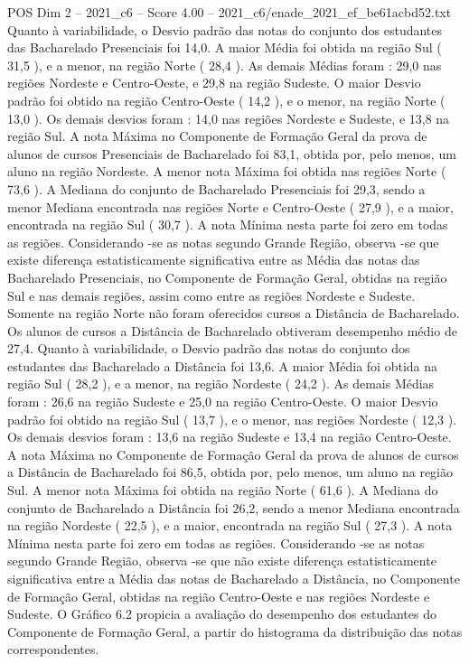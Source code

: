 \begin{textsample}{POS Dim 2 – 2021\_c6 – Score 4.00 – 2021\_c6/enade\_2021\_ef\_be61acbd52.txt}
Quanto à variabilidade, o Desvio padrão das notas do conjunto dos estudantes das Bacharelado Presenciais foi 14,0.
A maior Média foi obtida na região Sul ( 31,5 ), e a menor, na região Norte ( 28,4 ).
As demais Médias foram : 29,0 nas regiões Nordeste e Centro-Oeste, e 29,8 na região Sudeste.
O maior Desvio padrão foi obtido na região Centro-Oeste ( 14,2 ), e o menor, na região Norte ( 13,0 ).
Os demais desvios foram : 14,0 nas regiões Nordeste e Sudeste, e 13,8 na região Sul.
A nota Máxima no Componente de Formação Geral da prova de alunos de cursos Presenciais de Bacharelado foi 83,1, obtida por, pelo menos, um aluno na região Nordeste.
A menor nota Máxima foi obtida nas regiões Norte ( 73,6 ).
A Mediana do conjunto de Bacharelado Presenciais foi 29,3, sendo a menor Mediana encontrada nas regiões Norte e Centro-Oeste ( 27,9 ), e a maior, encontrada na região Sul ( 30,7 ).
A nota Mínima nesta parte foi zero em todas as regiões.
Considerando -se as notas segundo Grande Região, observa -se que existe diferença estatisticamente significativa entre as Média das notas das Bacharelado Presenciais, no Componente de Formação Geral, obtidas na região Sul e nas demais regiões, assim como entre as regiões Nordeste e Sudeste.
Somente na região Norte não foram oferecidos cursos a Distância de Bacharelado.
Os alunos de cursos a Distância de Bacharelado obtiveram desempenho médio de 27,4.
Quanto à variabilidade, o Desvio padrão das notas do conjunto dos estudantes das Bacharelado a Distância foi 13,6.
A maior Média foi obtida na região Sul ( 28,2 ), e a menor, na região Nordeste ( 24,2 ).
As demais Médias foram : 26,6 na região Sudeste e 25,0 na região Centro-Oeste.
O maior Desvio padrão foi obtido na região Sul ( 13,7 ), e o menor, nas regiões Nordeste ( 12,3 ).
Os demais desvios foram : 13,6 na região Sudeste e 13,4 na região Centro-Oeste.
A nota Máxima no Componente de Formação Geral da prova de alunos de cursos a Distância de Bacharelado foi 86,5, obtida por, pelo menos, um aluno na região Sul.
A menor nota Máxima foi obtida na região Norte ( 61,6 ).
A Mediana do conjunto de Bacharelado a Distância foi 26,2, sendo a menor Mediana encontrada na região Nordeste ( 22,5 ), e a maior, encontrada na região Sul ( 27,3 ).
A nota Mínima nesta parte foi zero em todas as regiões.
Considerando -se as notas segundo Grande Região, observa -se que não existe diferença estatisticamente significativa entre a Média das notas de Bacharelado a Distância, no Componente de Formação Geral, obtidas na região Centro-Oeste e nas regiões Nordeste e Sudeste.
O Gráfico 6.2 propicia a avaliação do desempenho dos estudantes do Componente de Formação Geral, a partir do histograma da distribuição das notas correspondentes.

\end{textsample}
